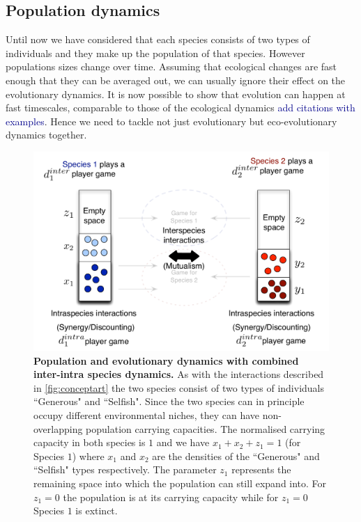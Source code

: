 \documentclass[12pt]{article}
\newcommand{\cha}[1]{\textcolor{darkblue}{#1}}
\begin{document}
\subsection{Population dynamics}

Until now we have considered that each species consists of two types of individuals and they make up the population of that species.
However populations sizes change over time. 
Assuming that ecological changes are fast enough that they can be averaged out, we can usually ignore their effect on the evolutionary dynamics.
It is now possible to show that evolution can happen at fast timescales, comparable to those of the ecological dynamics \cha{add citations with examples}.
Hence we need to tackle not just evolutionary but eco-evolutionary dynamics together.
%
\begin{figure}
\begin{center}
\includegraphics[scale=0.5]{../Figures/popdyninterintra.pdf}
\caption{\small{
\textbf{Population and evolutionary dynamics with combined inter-intra species dynamics.}
As with the interactions described in \ref{fig:conceptart} the two species consist of two types of individuals ``Generous" and ``Selfish".
Since the two species can in principle occupy different environmental niches, they  can have non-overlapping population carrying capacities.
The normalised carrying capacity in both species is $1$ and we have $x_1 + x_2 + z_1 = 1$ (for Species $1$) where $x_1$ and $x_2$ are the densities of the ``Generous" and ``Selfish" types respectively. 
The parameter $z_1$ represents the remaining space into which the population can still expand into.
For $z_1 = 0$ the population is at its carrying capacity while for $z_1 = 0$ Species $1$ is extinct. }
\label{fig:conceptartpopdyn}
}
\end{center}
\end{figure}
%
\end{document}
